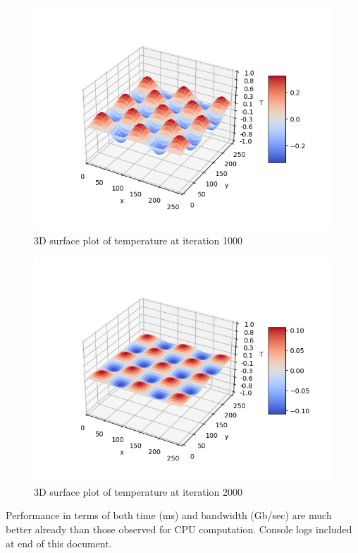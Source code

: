 \documentclass[12pt,letterpaper,twoside]{article}
\begin{document}
\begin{figure}[!htbp]
    \centering
    \includegraphics[scale=0.7]{global_1000.png}
    \caption{3D surface plot of temperature at iteration 1000}
\end{figure}

\begin{figure}[!htbp]
    \centering
    \includegraphics[scale=0.7]{global_2000.png}
    \caption{3D surface plot of temperature at iteration 2000}
\end{figure}

Performance in terms of both time (ms) and bandwidth (Gb/sec) are much 
better already than those observed for CPU computation. Console logs 
included at end of this document.
\end{document}
